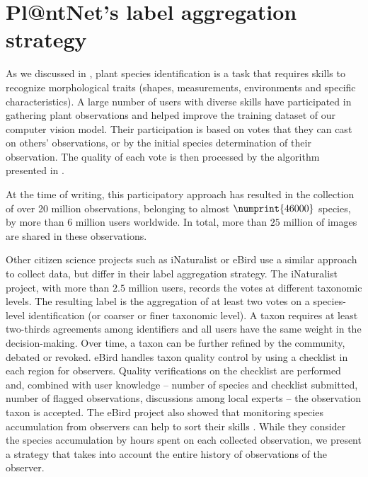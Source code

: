 \section{Pl@ntNet's label aggregation strategy}
\label{sec:aggregation_plantnet}

As we discussed in , plant species identification is a task that requires skills to recognize morphological traits (shapes, measurements, environments and specific characteristics).
A large number of users with diverse skills have participated in gathering plant observations and helped improve the training dataset of our computer vision model.
Their participation is based on votes that they can cast on others' observations, or by the initial species determination of their observation.
The quality of each vote is then processed by the algorithm presented in .

At the time of writing, this participatory approach has resulted in the collection of over 20 million observations, belonging to almost $\numprint{46000}$ species, by more than 6 million users worldwide. In total, more than $25$ million of images are shared in these observations.

Other citizen science projects such as iNaturalist \citep{van2018inaturalist} or eBird \citep{sullivan2009ebird} use a similar approach to collect data, but differ in their label aggregation strategy.
The iNaturalist project, with more than $2.5$ million users, records the votes at different taxonomic levels.
The resulting label is the aggregation of at least two votes on a species-level identification (or coarser or finer taxonomic level).
A taxon requires at least two-thirds agreements among identifiers and all users have the same weight in the decision-making.
Over time, a taxon can be further refined by the community, debated or revoked.
eBird handles taxon quality control by using a checklist in each region for observers.
Quality verifications on the checklist are performed and, combined with user knowledge -- number of species and checklist submitted, number of flagged observations, discussions among local experts -- the observation taxon is accepted.
The eBird project also showed that monitoring species accumulation from observers can help to sort their skills \citep{kelling2015}. While they consider the species accumulation by hours spent on each collected observation, we present a strategy that takes into account the entire history of observations of the observer.


